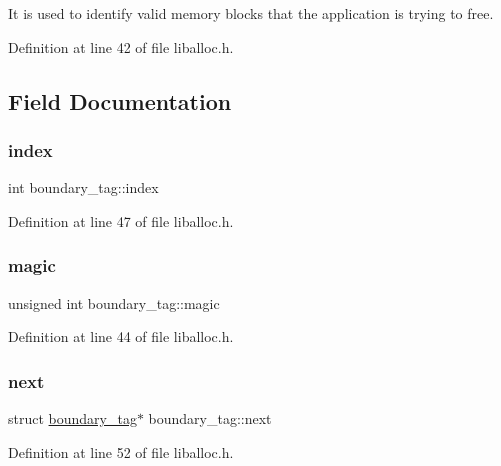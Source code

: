 It is used to identify valid memory blocks that the application is trying to free. 

Definition at line 42 of file liballoc.\+h.



\subsection{Field Documentation}
\mbox{\label{a00126_adfc426eed5361508d62c6e8f484bd270_adfc426eed5361508d62c6e8f484bd270}} 
\subsubsection{\texorpdfstring{index}{index}}
{\footnotesize\ttfamily int boundary\+\_\+tag\+::index}



Definition at line 47 of file liballoc.\+h.

\mbox{\label{a00126_a96a8bec3c60c81b8c41239169ec70b6c_a96a8bec3c60c81b8c41239169ec70b6c}} 
\subsubsection{\texorpdfstring{magic}{magic}}
{\footnotesize\ttfamily unsigned int boundary\+\_\+tag\+::magic}



Definition at line 44 of file liballoc.\+h.

\mbox{\label{a00126_a123f0bd815d7fda9f535b031640662fc_a123f0bd815d7fda9f535b031640662fc}} 
\subsubsection{\texorpdfstring{next}{next}}
{\footnotesize\ttfamily struct \hyperlink{a00126}{boundary\+\_\+tag}$\ast$ boundary\+\_\+tag\+::next}



Definition at line 52 of file liballoc.\+h.

